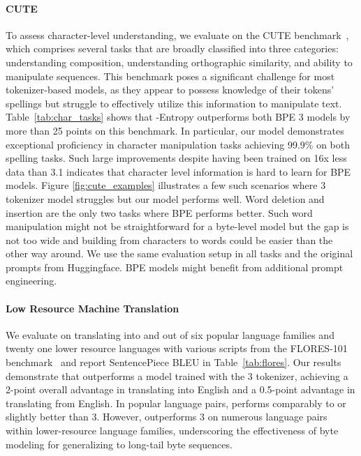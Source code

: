 \documentclass[]{fairmeta}
\begin{document}
\paragraph{CUTE}
To assess character-level understanding, we evaluate \model{} on the CUTE benchmark~\citep{edman2024cute}, which comprises several tasks that are broadly classified into three categories: understanding composition, understanding orthographic similarity, and ability to manipulate sequences. This benchmark poses a significant challenge for most tokenizer-based models, as they appear to possess knowledge of their tokens' spellings but struggle to effectively utilize this information to manipulate text. Table~\ref{tab:char_tasks} shows that \model{}-Entropy outperforms both BPE \llama{} 3 models by more than 25 points on this benchmark. In particular, our model demonstrates exceptional proficiency in character manipulation tasks achieving 99.9\% on both spelling tasks. Such large improvements despite \model{} having been trained on 16x less data than \llama{} 3.1 indicates that character level information is hard to learn for BPE models.
Figure \ref{fig:cute_examples} illustrates a few such scenarios where \llama{} 3 tokenizer model struggles but our \model{} model performs well. 
Word deletion and insertion are the only two tasks where BPE performs better. Such word manipulation might not be straightforward for a byte-level model but the gap is not too wide and building from characters to words could be easier than the other way around. We use the same evaluation setup in all tasks and the original prompts from Huggingface. BPE models might benefit from additional prompt engineering.

\paragraph{Low Resource Machine Translation} We evaluate \model{} on translating into and out of six popular language families and twenty one lower resource languages with various scripts from the FLORES-101 benchmark~\citep{goyal2022flores} and report SentencePiece BLEU in Table~\ref{tab:flores}.
Our results demonstrate that \model{} outperforms a model trained with the \llama{} 3 tokenizer, achieving a 2-point overall advantage in translating into English and a 0.5-point advantage in translating from English. In popular language pairs, \model{} performs comparably to or slightly better than \llama{} 3. However, \model{} outperforms \llama{} 3 on numerous language pairs within lower-resource language families, underscoring the effectiveness of byte modeling for generalizing to long-tail byte sequences.
\end{document}
